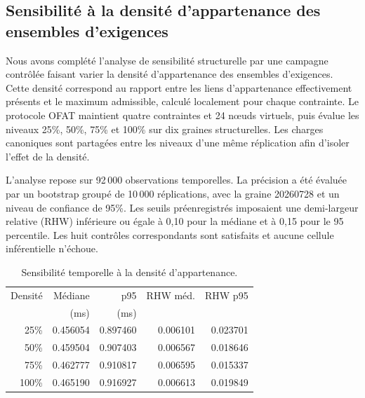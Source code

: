 %
%
%
%
\subsection{Sensibilité à la densité d'appartenance des ensembles d'exigences}
\label{subsec:sa4-membership-density}

Nous avons complété l'analyse de sensibilité structurelle par une campagne contrôlée faisant varier la densité d'appartenance des ensembles d'exigences. Cette densité correspond au rapport entre les liens d'appartenance effectivement présents et le maximum admissible, calculé localement pour chaque contrainte. Le protocole OFAT maintient quatre contraintes et 24 nœuds virtuels, puis évalue les niveaux 25\%, 50\%, 75\% et 100\% sur dix graines structurelles. Les charges canoniques sont partagées entre les niveaux d'une même réplication afin d'isoler l'effet de la densité.

L'analyse repose sur 92\,000 observations temporelles. La précision a été évaluée par un bootstrap groupé de 10\,000 réplications, avec la graine 20260728 et un niveau de confiance de 95\%. Les seuils préenregistrés imposaient une demi-largeur relative (RHW) inférieure ou égale à 0,10 pour la médiane et à 0,15 pour le 95\ieme{} percentile. Les huit contrôles correspondants sont satisfaits et aucune cellule inférentielle n'échoue.

\begin{table}[t]
\caption{Sensibilité temporelle à la densité d'appartenance.}
\label{tab:membership-density-stage10}
\centering
\scriptsize
\setlength{\tabcolsep}{3pt}
\begin{tabular}{r r r r r}
\hline
Densité & Médiane & p95 & RHW méd. & RHW p95 \\
 & (ms) & (ms) & & \\
\hline
25\% & 0.456054 & 0.897460 & 0.006101 & 0.023701 \\
50\% & 0.459504 & 0.907403 & 0.006567 & 0.018646 \\
75\% & 0.462777 & 0.910817 & 0.006595 & 0.015337 \\
100\% & 0.465190 & 0.916927 & 0.006613 & 0.019849 \\
\hline
\end{tabular}
\end{table}

